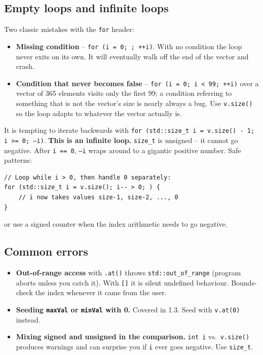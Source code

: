 \documentclass[11pt]{article}
\begin{document}
\subsection{Empty loops and infinite loops}

Two classic mistakes with the \texttt{for} header:

\begin{itemize}
    \item \textbf{Missing condition} -- \texttt{for (i = 0; ; ++i)}.
          With no condition the loop never exits on its own. It will
          eventually walk off the end of the vector and crash.
    \item \textbf{Condition that never becomes false} --
          \texttt{for (i = 0; i < 99; ++i)} over a vector of 365
          elements visits only the first 99; a condition referring to
          something that is not the vector's size is nearly always a
          bug. Use \texttt{v.size()} so the loop adapts to whatever
          the vector actually is.
\end{itemize}

\begin{warnbox}
It is tempting to iterate backwards with
\texttt{for (std::size\_t i = v.size() - 1; i >= 0; --i)}. \textbf{This
is an infinite loop.} \texttt{size\_t} is unsigned -- it cannot go
negative. After \texttt{i == 0}, \texttt{--i} wraps around to a
gigantic positive number. Safe patterns:
\begin{lstlisting}
// Loop while i > 0, then handle 0 separately:
for (std::size_t i = v.size(); i-- > 0; ) {
    // i now takes values size-1, size-2, ..., 0
}
\end{lstlisting}
or use a signed counter when the index arithmetic needs to go
negative.
\end{warnbox}

\subsection{Common errors}

\begin{itemize}
    \item \textbf{Out-of-range access} with \texttt{.at()} throws
          \texttt{std::out\_of\_range} (program aborts unless you
          catch it). With \texttt{[]} it is silent undefined
          behaviour. Bounds-check the index whenever it came from the
          user.
    \item \textbf{Seeding \texttt{maxVal} or \texttt{minVal} with 0.}
          Covered in 1.3. Seed with \texttt{v.at(0)} instead.
    \item \textbf{Mixing signed and unsigned in the comparison.}
          \texttt{int i} vs.\ \texttt{v.size()} produces warnings and
          can surprise you if \texttt{i} ever goes negative. Use
          \texttt{size\_t}.
\end{itemize}
\end{document}
